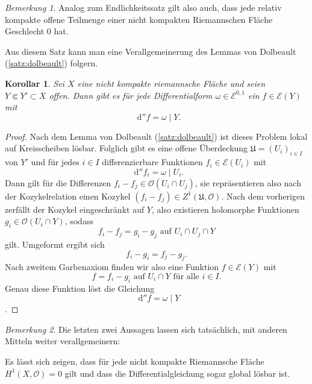 \documentclass[11pt,a4paper,toc=bibliography]{scrartcl}
\theoremstyle{thm}
\newtheorem{koro}{Korollar}[section]
\theoremstyle{def}
\theoremstyle{remark}
\newtheorem*{bem}{Bemerkung}
\newcommand*\dif{\mathop{}\!\mathrm{d}}\newcommand{\einschraenkung}{\,\rule[-5pt]{0.4pt}{12pt}\,{}} %
\begin{document}
\begin{bem}
Analog zum Endlichkeitssatz gilt also auch, dass jede relativ kompakte offene Teilmenge einer nicht kompakten Riemannschen Fläche Geschlecht 0 hat.
\end{bem}
Aus diesem Satz kann man eine Verallgemeinerung des Lemmas von Dolbeault (\ref{satz:dolbeault}) folgern.
\begin{koro}
Sei $X$ eine nicht kompakte riemannsche Fläche und seien $Y\Subset Y'\subset X$ offen. Dann gibt es für jede Differentialform $\omega \in \mathcal{E}^{0,1}$ ein $f\in \mathcal{E}(Y)$ mit 
\[
\dif ''f = \omega\mid Y.
\]
\end{koro}
\begin{proof}
	Nach dem Lemma von Dolbeault (\ref{satz:dolbeault}) ist dieses Problem lokal auf Kreisscheiben lösbar. Folglich gibt es eine offene Überdeckung $\mathfrak{U}=(U_i)_{i\in I}$ von $Y'$ und für jedes $i\in I$ differenzierbare Funktionen $f_i\in \mathcal{E}(U_i)$ mit \[
	\dif ''f_i = \omega \mid U_i.\] 
	Dann gilt für die Differenzen $f_i-f_j\in\mathcal{O}(U_i\cap U_j)$, sie repräsentieren also nach der Kozykelrelation einen Kozykel $(f_i-f_j)\in Z^1(\mathfrak{U},\mathcal{O})$. Nach dem vorherigen  zerfällt der Kozykel eingeschränkt auf $Y$, also existieren holomorphe Funktionen $g_i\in\mathcal{O}(U_i\cap Y)$, sodass
	\[
	f_i-f_j=g_i-g_j\text{ auf } U_i\cap U_j\cap Y
	\]
	gilt. Umgeformt ergibt sich
	\[
	f_i-g_i=f_j-g_j.
	\]
	 Nach zweitem Garbenaxiom finden wir also eine Funktion $f\in \mathcal{E}(Y)$ mit
	 \[
	 f=f_i-g_i\text{ auf }U_i\cap Y\text{ für alle }i\in I.
	 \]
	 Genau diese Funktion löst die Gleichung
	 \[
	 \dif'' f=\omega\mid Y\].
	 \end{proof}
\begin{bem}
	Die letzten zwei Aussagen lassen sich tatsächlich, mit anderen Mitteln weiter verallgemeinern:
	
	Es lässt sich zeigen, dass für jede nicht kompakte Riemannsche Fläche $H^1(X,\mathcal{O})=0$ gilt\cite[S.179,26.1]{forster} und dass die Differentialgleichung sogar global lösbar ist\cite[S.179,25.6]{forster}.
\end{bem}
\end{document}
